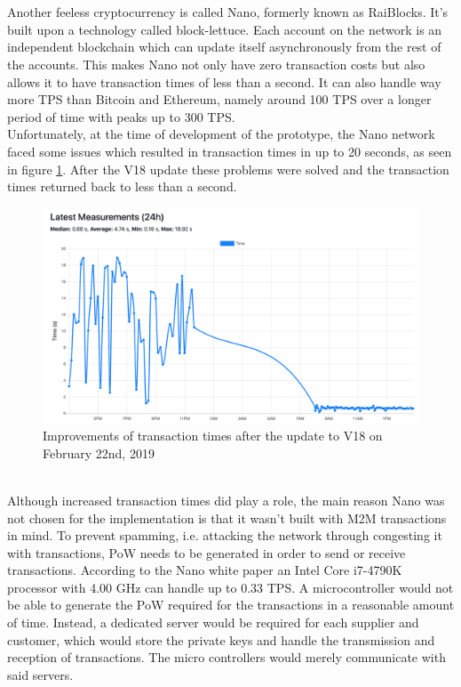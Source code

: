 \\\\
Another feeless cryptocurrency is called Nano, formerly known as RaiBlocks. It's built upon a technology called block-lettuce. Each account on the network is an independent blockchain which can update itself asynchronously from the rest of the accounts. This makes Nano not only have zero transaction costs but also allows it to have transaction times of less than a second. It can also handle way more TPS than Bitcoin and Ethereum, namely around 100 TPS over a longer period of time with peaks up to 300 TPS\cite{nano-stress-test}.
\\
Unfortunately, at the time of development of the prototype, the Nano network faced some issues which resulted in transaction times in up to 20 seconds, as seen in figure \ref{fig:NanoConfirmationTime}. After the V18 update these problems were solved and the transaction times returned back to less than a second\cite{nano-confirmation-time}.
\\
\begin{figure}[H]
    \includegraphics[width=\textwidth]{img/nano-confirmation-time.pdf}
    \caption{Improvements of transaction times after the update to V18 on February 22nd, 2019}
    \label{fig:NanoConfirmationTime}
\end{figure}
\leavevmode
\\
Although increased transaction times did play a role, the main reason Nano was not chosen for the implementation is that it wasn't built with M2M transactions in mind. To prevent spamming, i.e. attacking the network through congesting it with transactions, PoW needs to be generated in order to send or receive transactions. According to the Nano white paper\cite{nano-white-paper} an Intel Core i7-4790K processor with 4.00 GHz can handle up to 0.33 TPS. A microcontroller would not be able to generate the PoW required for the transactions in a reasonable amount of time. Instead, a dedicated server would be required for each supplier and customer, which would store the private keys and handle the transmission and reception of transactions. The micro controllers would merely communicate with said servers.
